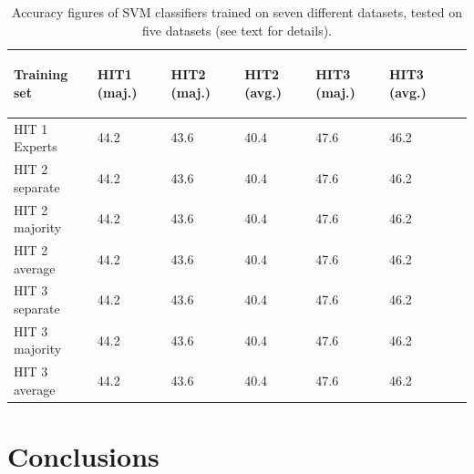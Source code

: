 \documentclass[11pt, a4paper,onecolumn]{article}
\begin{document}
\begin{table}
\begin{center}
\begin{small}
\begin{tabular}{|l|l|l|l|l|l|l|} \hline
 Training set & 
 {\begin{sideways}\parbox{2cm}{\centering HIT1 (maj.)}\end{sideways}} &
 {\begin{sideways}\parbox{2cm}{\centering HIT2 (maj.)}\end{sideways}} &
 {\begin{sideways}\parbox{2cm}{\centering HIT2 (avg.)}\end{sideways}} &
 {\begin{sideways}\parbox{2cm}{\centering HIT3 (maj.)}\end{sideways}} &
 {\begin{sideways}\parbox{2cm}{\centering HIT3 (avg.)}\end{sideways}} \\ \hline
 HIT 1 Experts & 44.2 & 43.6 & 40.4 & 47.6 & 46.2  \\ \hline
 HIT 2 separate & 44.2 & 43.6 & 40.4 & 47.6 & 46.2  \\ \hline
 HIT 2 majority & 44.2 & 43.6 & 40.4 & 47.6 & 46.2  \\ \hline
 HIT 2 average & 44.2 & 43.6 & 40.4 & 47.6 & 46.2  \\ \hline
 HIT 3 separate & 44.2 & 43.6 & 40.4 & 47.6 & 46.2  \\ \hline
 HIT 3 majority & 44.2 & 43.6 & 40.4 & 47.6 & 46.2  \\ \hline
 HIT 3 average & 44.2 & 43.6 & 40.4 & 47.6 & 46.2  \\ \hline
\end{tabular}
\end{small}
\end{center}
\caption{Accuracy figures of SVM classifiers trained on seven different datasets, tested on five datasets (see text for details).}
\label{table:class_hit_comparison}
\end{table}



\section{Conclusions}
\label{sect:conclusions}
\end{document}
